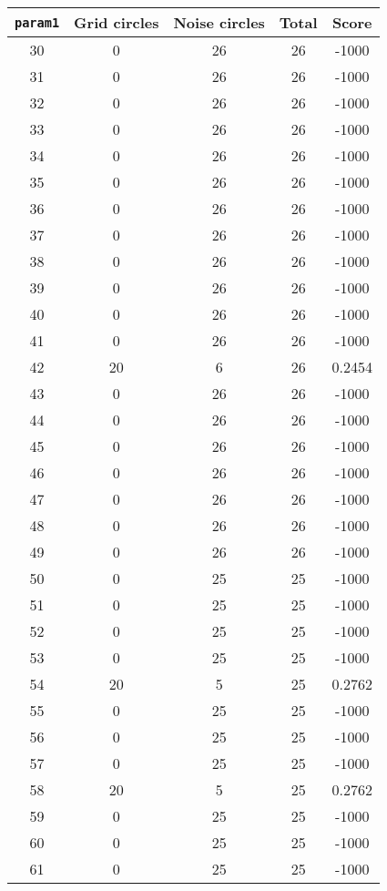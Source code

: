 \documentclass[letterpaper, 12pt]{article}
\begin{document}
\begin{longtable}{|c|c|c|c|c|}
\hline
\textbf{\texttt{param1}} & \textbf{Grid circles} & \textbf{Noise circles} & \textbf{Total} & \textbf{Score} \\
\hline
30 & 0 & 26 & 26 & -1000 \\
\hline
31 & 0 & 26 & 26 & -1000 \\
\hline
32 & 0 & 26 & 26 & -1000 \\
\hline
33 & 0 & 26 & 26 & -1000 \\
\hline
34 & 0 & 26 & 26 & -1000 \\
\hline
35 & 0 & 26 & 26 & -1000 \\
\hline
36 & 0 & 26 & 26 & -1000 \\
\hline
37 & 0 & 26 & 26 & -1000 \\
\hline
38 & 0 & 26 & 26 & -1000 \\
\hline
39 & 0 & 26 & 26 & -1000 \\
\hline
40 & 0 & 26 & 26 & -1000 \\
\hline
41 & 0 & 26 & 26 & -1000 \\
\hline
42 & 20 & 6 & 26 & 0.2454 \\
\hline
43 & 0 & 26 & 26 & -1000 \\
\hline
44 & 0 & 26 & 26 & -1000 \\
\hline
45 & 0 & 26 & 26 & -1000 \\
\hline
46 & 0 & 26 & 26 & -1000 \\
\hline
47 & 0 & 26 & 26 & -1000 \\
\hline
48 & 0 & 26 & 26 & -1000 \\
\hline
49 & 0 & 26 & 26 & -1000 \\
\hline
50 & 0 & 25 & 25 & -1000 \\
\hline
51 & 0 & 25 & 25 & -1000 \\
\hline
52 & 0 & 25 & 25 & -1000 \\
\hline
53 & 0 & 25 & 25 & -1000 \\
\hline
54 & 20 & 5 & 25 & 0.2762 \\
\hline
55 & 0 & 25 & 25 & -1000 \\
\hline
56 & 0 & 25 & 25 & -1000 \\
\hline
57 & 0 & 25 & 25 & -1000 \\
\hline
58 & 20 & 5 & 25 & 0.2762 \\
\hline
59 & 0 & 25 & 25 & -1000 \\
\hline
60 & 0 & 25 & 25 & -1000 \\
\hline
61 & 0 & 25 & 25 & -1000 \\

\end{longtable}
\end{document}
